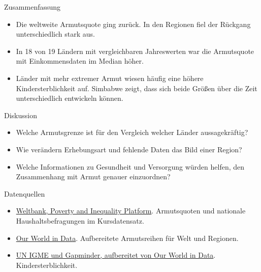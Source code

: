 \documentclass[aspectratio=32,12pt,t]{beamer}
\begin{document}
\begin{frame}{Zusammenfassung}
  \begin{itemize}[<+->]
    \setlength{\itemsep}{4mm}
    \item Die weltweite Armutsquote ging zurück. In den Regionen fiel der Rückgang unterschiedlich stark aus.
    \item In 18 von 19 Ländern mit vergleichbaren Jahreswerten war die Armutsquote mit Einkommensdaten im Median höher.
    \item Länder mit mehr extremer Armut wiesen häufig eine höhere Kindersterblichkeit auf. Simbabwe zeigt, dass sich beide Größen über die Zeit unterschiedlich entwickeln können.
  \end{itemize}
\end{frame}

\begin{frame}{Diskussion}
  \begin{itemize}
    \setlength{\itemsep}{5mm}
    \item Welche Armutsgrenze ist für den Vergleich welcher Länder aussagekräftig?
    \item Wie verändern Erhebungsart und fehlende Daten das Bild einer Region?
    \item Welche Informationen zu Gesundheit und Versorgung würden helfen, den Zusammenhang mit Armut genauer einzuordnen?
  \end{itemize}
\end{frame}

\begin{frame}{Datenquellen}
  \begin{itemize}
    \setlength{\itemsep}{4mm}
    \item \href{https://pip.worldbank.org/}{Weltbank, Poverty and Inequality Platform}. Armutsquoten und nationale Haushaltsbefragungen im Kursdatensatz.
    \item \href{https://ourworldindata.org/grapher/share-of-population-in-extreme-poverty}{Our World in Data}. Aufbereitete Armutsreihen für Welt und Regionen.
    \item \href{https://ourworldindata.org/grapher/child-mortality}{UN IGME und Gapminder, aufbereitet von Our World in Data}. Kindersterblichkeit.
  \end{itemize}
\end{frame}
\end{document}
